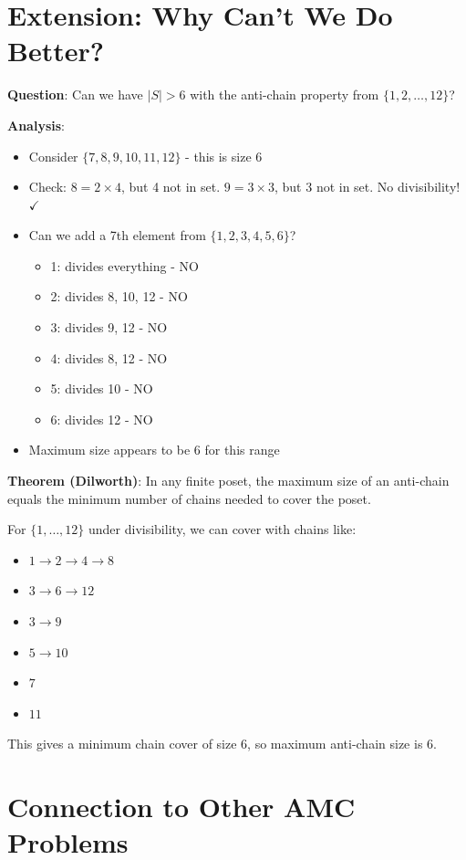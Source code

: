 \documentclass[12pt]{article}
\begin{document}
\section*{Extension: Why Can't We Do Better?}

\textbf{Question}: Can we have $|S| > 6$ with the anti-chain property from $\{1,2,\ldots,12\}$?

\textbf{Analysis}:
\begin{itemize}
    \item Consider $\{7, 8, 9, 10, 11, 12\}$ - this is size 6
    \item Check: $8 = 2 \times 4$, but 4 not in set. $9 = 3 \times 3$, but 3 not in set. No divisibility! $\checkmark$
    \item Can we add a 7th element from $\{1,2,3,4,5,6\}$?
    \begin{itemize}
        \item 1: divides everything - NO
        \item 2: divides 8, 10, 12 - NO
        \item 3: divides 9, 12 - NO
        \item 4: divides 8, 12 - NO
        \item 5: divides 10 - NO
        \item 6: divides 12 - NO
    \end{itemize}
    \item Maximum size appears to be 6 for this range
\end{itemize}

\textbf{Theorem (Dilworth)}: In any finite poset, the maximum size of an anti-chain equals the minimum number of chains needed to cover the poset.

For $\{1,\ldots,12\}$ under divisibility, we can cover with chains like:
\begin{itemize}
    \item $1 \to 2 \to 4 \to 8$
    \item $3 \to 6 \to 12$
    \item $3 \to 9$
    \item $5 \to 10$
    \item $7$
    \item $11$
\end{itemize}

This gives a minimum chain cover of size 6, so maximum anti-chain size is 6.

\section*{Connection to Other AMC Problems}
\end{document}
